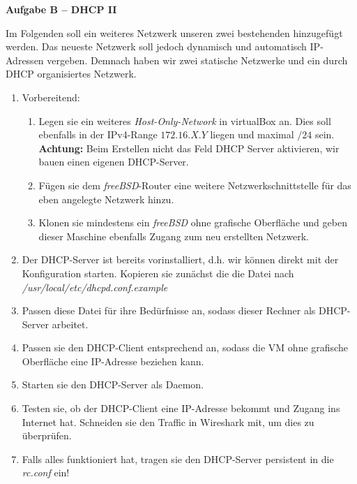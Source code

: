 \documentclass[paper=a4,fontsize=11pt]{scrartcl}%
\numberwithin{equation}{section}
\begin{document}
\begin{center}\Large{\textbf{Aufgabe B -- DHCP II}}\end{center}\vskip0.25in
Im Folgenden soll ein weiteres Netzwerk unseren zwei bestehenden hinzugefügt werden. Das neueste Netzwerk soll jedoch dynamisch und automatisch IP-Adressen vergeben. Demnach haben wir zwei statische Netzwerke und ein durch DHCP organisiertes Netzwerk.
\begin{enumerate}
	\item Vorbereitend:
	\begin{enumerate}[label=(\alph*)]
		\item Legen sie ein weiteres \emph{Host-Only-Network} in virtualBox an. Dies soll ebenfalls in der IPv4-Range $172.16.X.Y$ liegen und maximal $/24$ sein.\\
		\textbf{Achtung:} Beim Erstellen nicht das Feld DHCP Server aktivieren, wir bauen einen eigenen DHCP-Server.
		\item Fügen sie dem \emph{freeBSD}-Router eine weitere Netzwerkschnittstelle für das eben angelegte Netzwerk hinzu.
		\item Klonen sie mindestens ein \emph{freeBSD} ohne grafische Oberfläche und geben dieser Maschine ebenfalls Zugang zum neu erstellten Netzwerk.
	\end{enumerate}
	\item Der DHCP-Server ist bereits vorinstalliert, d.h. wir können direkt mit der Konfiguration starten. Kopieren sie zunächst die die Datei  nach \emph{/usr/local/etc/dhcpd.conf.example}
	\item Passen diese Datei für ihre Bedürfnisse an, sodass dieser Rechner als DHCP-Server arbeitet.
	\item Passen sie den DHCP-Client entsprechend an, sodass die VM ohne grafische Oberfläche eine IP-Adresse beziehen kann.
	\item Starten sie den DHCP-Server als Daemon.
	\item Testen sie, ob der DHCP-Client eine IP-Adresse bekommt und Zugang ins Internet hat. Schneiden sie den Traffic in Wireshark mit, um dies zu überprüfen.
	\item Falls alles funktioniert hat, tragen sie den DHCP-Server persistent in die \emph{rc.conf} ein!
\end{enumerate}
\end{document}
